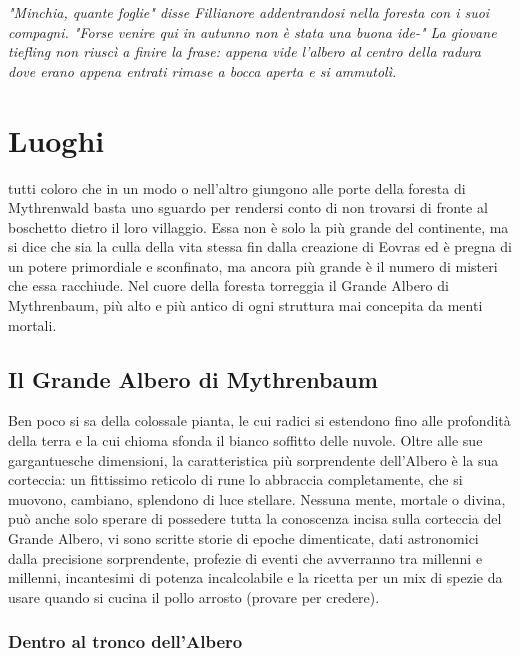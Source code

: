 
\begin{DndReadAloud}
  \it
  "Minchia, quante foglie" disse Fillianore addentrandosi nella foresta con i suoi compagni. "Forse venire qui in autunno non è stata una buona ide-" La giovane tiefling non riuscì a finire la frase: appena vide l'albero al centro della radura dove erano appena entrati rimase a bocca aperta e si ammutolì.
\end{DndReadAloud}

\section{Luoghi}

 tutti coloro che in un modo o nell'altro giungono alle porte della foresta di Mythrenwald basta uno sguardo per rendersi conto di non trovarsi di fronte al boschetto dietro il loro villaggio. Essa non è solo la più grande del continente, ma si dice che sia la culla della vita stessa fin dalla creazione di Eovras ed è pregna di un potere primordiale e sconfinato, ma ancora più grande è il numero di misteri che essa racchiude. Nel cuore della foresta torreggia il Grande Albero di Mythrenbaum, più alto e più antico di ogni struttura mai concepita da menti mortali.

\subsection{Il Grande Albero di Mythrenbaum}

Ben poco si sa della colossale pianta, le cui radici si estendono fino alle profondità della terra e la cui chioma sfonda il bianco soffitto delle nuvole. Oltre alle sue gargantuesche dimensioni, la caratteristica più sorprendente dell'Albero è la sua corteccia: un fittissimo reticolo di rune lo abbraccia completamente, che si muovono, cambiano, splendono di luce stellare. Nessuna mente, mortale o divina, può anche solo sperare di possedere tutta la conoscenza incisa sulla corteccia del Grande Albero, vi sono scritte storie di epoche dimenticate, dati astronomici dalla precisione sorprendente, profezie di eventi che avverranno tra millenni e millenni, incantesimi di potenza incalcolabile e la ricetta per un mix di spezie da usare quando si cucina il pollo arrosto (provare per credere).

\subsubsection{Dentro al tronco dell'Albero}

